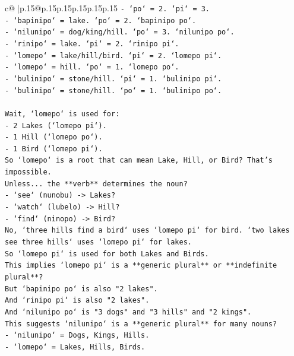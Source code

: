 \documentclass{article}
\begin{document}
{\begin{supertabular}{c@{$\;$}|p{.15\linewidth}@{}p{.15\linewidth}p{.15\linewidth}p{.15\linewidth}p{.15\linewidth}p{.15\linewidth}}
{{{\texttt{{-} `po` = 2. `pi` = 3.} \\
\texttt{{-} `bapinipo` = lake. `po` = 2. `bapinipo po`.} \\
\texttt{{-} `nilunipo` = dog/king/hill. `po` = 3. `nilunipo po`.} \\
\texttt{{-} `rinipo` = lake. `pi` = 2. `rinipo pi`.} \\
\texttt{{-} `lomepo` = lake/hill/bird. `pi` = 2. `lomepo pi`.} \\
\texttt{{-} `lomepo` = hill. `po` = 1. `lomepo po`.} \\
\texttt{{-} `bulinipo` = stone/hill. `pi` = 1. `bulinipo pi`.} \\
\texttt{{-} `bulinipo` = stone/hill. `po` = 1. `bulinipo po`.} \\
\\ 
\texttt{Wait, `lomepo` is used for:} \\
\texttt{{-} 2 Lakes (`lomepo pi`).} \\
\texttt{{-} 1 Hill (`lomepo po`).} \\
\texttt{{-} 1 Bird (`lomepo pi`).} \\
\texttt{So `lomepo` is a root that can mean Lake, Hill, or Bird? That's impossible.} \\
\texttt{Unless... the **verb** determines the noun?} \\
\texttt{{-} `see` (nunobu) {-}> Lakes?} \\
\texttt{{-} `watch` (lubelo) {-}> Hill?} \\
\texttt{{-} `find` (ninopo) {-}> Bird?} \\
\texttt{No, `three hills find a bird` uses `lomepo pi` for bird. `two lakes see three hills` uses `lomepo pi` for lakes.} \\
\texttt{So `lomepo pi` is used for both Lakes and Birds.} \\
\texttt{This implies `lomepo pi` is a **generic plural** or **indefinite plural**?} \\
\texttt{But `bapinipo po` is also "2 lakes".} \\
\texttt{And `rinipo pi` is also "2 lakes".} \\
\texttt{And `nilunipo po` is "3 dogs" and "3 hills" and "2 kings".} \\
\texttt{This suggests `nilunipo` is a **generic plural** for many nouns?} \\
\texttt{{-} `nilunipo` = Dogs, Kings, Hills.} \\
\texttt{{-} `lomepo` = Lakes, Hills, Birds.} \\
}}}
\end{supertabular}}
\end{document}
